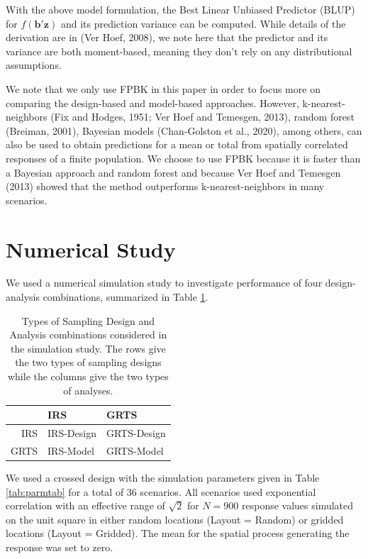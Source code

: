 \documentclass[]{elsarticle} %
\begin{document}
With the above model formulation, the Best Linear Unbiased Predictor
(BLUP) for \(f(\mathbf{b}'\mathbf{z})\) and its prediction variance can
be computed. While details of the derivation are in (Ver Hoef, 2008), we
note here that the predictor and its variance are both moment-based,
meaning they don't rely on any distributional assumptions.

We note that we only use FPBK in this paper in order to focus more on
comparing the design-based and model-based approaches. However,
k-nearest-neighbors (Fix and Hodges, 1951; Ver Hoef and Temesgen, 2013),
random forest (Breiman, 2001), Bayesian models (Chan-Golston et al.,
2020), among others, can also be used to obtain predictions for a mean
or total from spatially correlated responses of a finite population. We
choose to use FPBK because it is faster than a Bayesian approach and
random forest and because Ver Hoef and Temesgen (2013) showed that the
method outperforms k-nearest-neighbors in many scenarios.

\hypertarget{sec:numstudy}{%
\section{Numerical Study}\label{sec:numstudy}}

We used a numerical simulation study to investigate performance of four
design-analysis combinations, summarized in Table
\ref{tab:designanalysis}.

\begin{table}[ht]
\centering
\begin{tabular}{r|ll}
  \hline
 & IRS & GRTS \\ 
  \hline
IRS & IRS-Design & GRTS-Design \\ 
  GRTS & IRS-Model & GRTS-Model \\ 
   \hline
\end{tabular}
\caption{\label{tab:designanalysis} Types of Sampling Design and Analysis combinations considered in the simulation study. The rows give the two types of sampling designs while the columns give the two types of analyses.} 
\end{table}

We used a crossed design with the simulation parameters given in Table
\ref{tab:parmtab} for a total of 36 scenarios. All scenarios used
exponential correlation with an effective range of \(\sqrt{2}\) for
\(N = 900\) response values simulated on the unit square in either
random locations (Layout = Random) or gridded locations (Layout =
Gridded). The mean for the spatial process generating the response was
set to zero.
\end{document}
